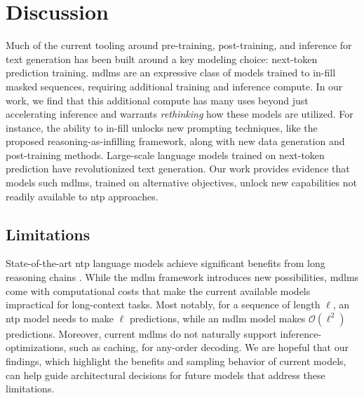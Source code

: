 \section{Discussion}
Much of the current tooling around pre-training, post-training, and inference for text generation has been built around a key modeling choice: next-token prediction training. \glspl{mdlm} are an expressive class of models trained to in-fill masked sequences, requiring additional training and inference compute. In our work, we find that this additional compute has many uses beyond just accelerating inference and warrants \textit{rethinking} how these models are utilized. For instance, the ability to in-fill unlocks new prompting techniques, like the proposed reasoning-as-infilling framework, along with new data generation and post-training methods. Large-scale language models trained on next-token prediction have revolutionized text generation. Our work provides evidence that models such \glspl{mdlm}, trained on alternative objectives, unlock new capabilities not readily available to \gls{ntp} approaches.



















 












\subsection{Limitations}
State-of-the-art \gls{ntp} language models achieve significant benefits from long reasoning chains \citep{guo2025deepseek, openai2025o3}. While the \gls{mdlm} framework introduces new possibilities, \glspl{mdlm} come with computational costs that make the current available models impractical for long-context tasks. Most notably, for a sequence of length $\ell$, an \gls{ntp} model needs to make $\ell$ predictions, while an \gls{mdlm} model makes $\mathcal{O}(\ell^2)$ predictions. Moreover, current \glspl{mdlm} do not naturally support inference-optimizations, such as caching, for any-order decoding. We are hopeful that our findings, which highlight the benefits and sampling behavior of current models, can help guide architectural decisions for future models that address these limitations. 

